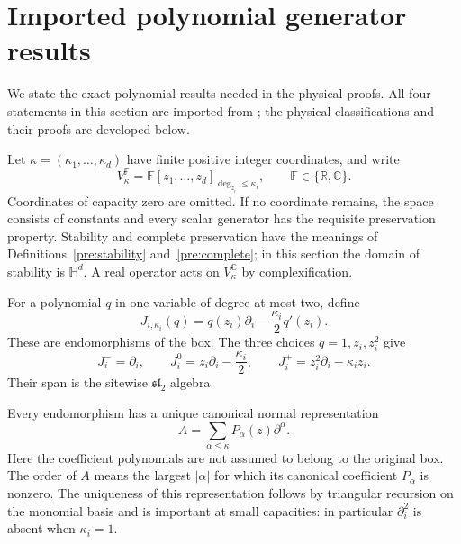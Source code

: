 \documentclass[reqno]{amsart}
\theoremstyle{definition}
\theoremstyle{remark}
\newcommand{\C}{\mathbb C}
\newcommand{\R}{\mathbb R}
\newcommand{\HH}{\mathbb H}
\begin{document}
\section{Imported polynomial generator results}\label{gen:section}

We state the exact polynomial results needed in the physical proofs.
All four statements in this section are imported from \cite{WeiGenerators2026};
the physical classifications and their proofs are developed below.

Let \(\kappa=(\kappa_1,\ldots,\kappa_d)\) have finite positive integer
coordinates, and write
\[
 V_\kappa^{\mathbb F}
 =\mathbb F[z_1,\ldots,z_d]_{\deg_{z_i}\leq\kappa_i},
 \qquad \mathbb F\in\{\R,\C\}.
\]
Coordinates of capacity zero are omitted.  If no coordinate remains, the
space consists of constants and every scalar generator has the requisite
preservation property.  Stability and complete preservation have the meanings
of Definitions~\ref{pre:stability} and~\ref{pre:complete}; in this section the
domain of stability is \(\HH^d\).
A real operator acts on \(V_\kappa^\C\) by complexification.

For a polynomial \(q\) in one variable of degree at most two, define
\begin{equation}
 J_{i,\kappa_i}(q)
 =q(z_i)\partial_i-\frac{\kappa_i}{2}q'(z_i).
 \label{gen:eq-J}
\end{equation}
These are endomorphisms of the box.  The three choices \(q=1,z_i,z_i^2\)
give
\[
 J_i^-=\partial_i,\qquad
 J_i^0=z_i\partial_i-\frac{\kappa_i}{2},\qquad
 J_i^+=z_i^2\partial_i-\kappa_i z_i.
\]
Their span is the sitewise \(\mathfrak{sl}_2\) algebra.

Every endomorphism has a unique canonical normal representation
\begin{equation}
 A=\sum_{\alpha\leq\kappa}P_\alpha(z)\partial^\alpha.
 \label{gen:eq-canonical}
\end{equation}
Here the coefficient polynomials are not assumed to belong to the original
box.  The order of \(A\) means the largest \(|\alpha|\) for which its
canonical coefficient \(P_\alpha\) is nonzero.  The uniqueness of this
representation follows by triangular recursion on the monomial basis
and is important at small capacities: in particular
\(\partial_i^2\) is absent when \(\kappa_i=1\).
\end{document}
